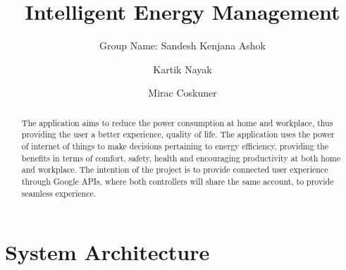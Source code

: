 \documentclass[runningheads]{llncs}
\begin{document}
%
\title{Intelligent Energy Management}

\author{Group Name: Sandesh Kenjana Ashok \and
Kartik Nayak \and
Mirac Coskuner}

%
\maketitle              %
%
\begin{abstract}
The application aims to reduce the power consumption at home and workplace, thus providing the user a better experience, quality of life. The application uses the power of internet of things to make decisions pertaining to energy efficiency, providing the benefits in terms of comfort, safety, health and encouraging productivity at both home and workplace. 
The intention of the project is to provide connected user experience through Google APIs, where both controllers will share the same account, to provide seamless experience. 

\end{abstract}
%
%
%
\section{System Architecture}
\end{document}
